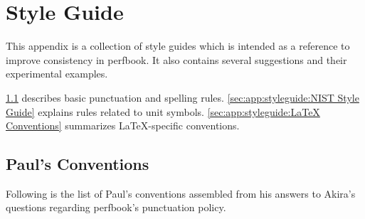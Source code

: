 
\chapter{Style Guide}
\label{chp:app:styleguide:Style Guide}
%

This appendix is a collection of style guides which is intended
as a reference to improve consistency in perfbook. It also contains
several suggestions and their experimental examples.

\cref{sec:app:styleguide:Paul's Conventions} describes basic
punctuation and spelling rules.
\cref{sec:app:styleguide:NIST Style Guide} explains rules
related to unit symbols.
\cref{sec:app:styleguide:LaTeX Conventions} summarizes
\LaTeX-specific conventions.

\section{Paul's Conventions}
\label{sec:app:styleguide:Paul's Conventions}

Following is the list of Paul's conventions assembled from his
answers to Akira's questions regarding perfbook's punctuation policy.

